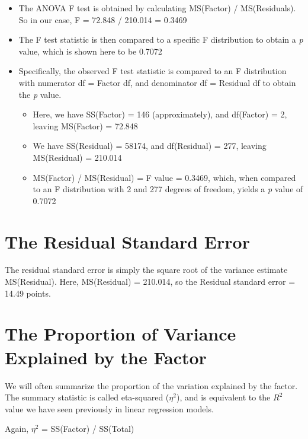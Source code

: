 \documentclass[
]{book}
\providecommand{\tightlist}{%
  \setlength{\itemsep}{0pt}\setlength{\parskip}{0pt}}
\begin{document}
\begin{itemize}
\tightlist
\item
  The ANOVA F test is obtained by calculating MS(Factor) / MS(Residuals). So in our case, F = 72.848 / 210.014 = 0.3469
\item
  The F test statistic is then compared to a specific F distribution to obtain a \emph{p} value, which is shown here to be 0.7072
\item
  Specifically, the observed F test statistic is compared to an F distribution with numerator df = Factor df, and denominator df = Residual df to obtain the \emph{p} value.

  \begin{itemize}
  \tightlist
  \item
    Here, we have SS(Factor) = 146 (approximately), and df(Factor) = 2, leaving MS(Factor) = 72.848
  \item
    We have SS(Residual) = 58174, and df(Residual) = 277, leaving MS(Residual) = 210.014
  \item
    MS(Factor) / MS(Residual) = F value = 0.3469, which, when compared to an F distribution with 2 and 277 degrees of freedom, yields a \emph{p} value of 0.7072
  \end{itemize}
\end{itemize}

\hypertarget{the-residual-standard-error}{%
\section{The Residual Standard Error}\label{the-residual-standard-error}}

The residual standard error is simply the square root of the variance estimate MS(Residual). Here, MS(Residual) = 210.014, so the Residual standard error = 14.49 points.

\hypertarget{the-proportion-of-variance-explained-by-the-factor}{%
\section{The Proportion of Variance Explained by the Factor}\label{the-proportion-of-variance-explained-by-the-factor}}

We will often summarize the proportion of the variation explained by the factor. The summary statistic is called eta-squared (\(\eta^2\)), and is equivalent to the \(R^2\) value we have seen previously in linear regression models.

Again, \(\eta^2\) = SS(Factor) / SS(Total)
\end{document}
